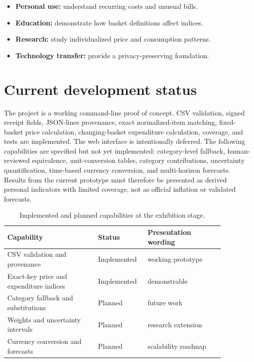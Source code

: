 \documentclass[10pt,a4paper]{article}
\newcommand{\chapter}[1]{
  \section{#1}
}
\begin{document}
\begin{itemize}
  \item \textbf{Personal use:} understand recurring costs and unusual bills.
  \item \textbf{Education:} demonstrate how basket definitions affect indices.
  \item \textbf{Research:} study individualized price and consumption patterns.
  \item \textbf{Technology transfer:} provide a privacy-preserving foundation.
\end{itemize}

\chapter{Current development status}
The project is a working command-line proof of concept. CSV validation,
signed receipt fields, JSON-lines provenance, exact normalized-item matching,
fixed-basket price calculation, changing-basket expenditure calculation,
coverage, and tests are implemented. The web interface is intentionally
deferred. The following capabilities are specified but not yet implemented:
category-level fallback, human-reviewed equivalence, unit-conversion tables,
category contributions, uncertainty quantification, time-based currency
conversion, and multi-horizon forecasts. Results from the current prototype
must therefore be presented as derived personal indicators with limited
coverage, not as official inflation or validated forecasts.

\begin{table}[ht]
  \centering
  \caption{Implemented and planned capabilities at the exhibition stage.}
  \small
  \begin{tabular}{p{0.38\linewidth}p{0.18\linewidth}p{0.32\linewidth}}
    \toprule
    Capability & Status & Presentation wording\\
    \midrule
    CSV validation and provenance & Implemented & working prototype\\
    Exact-key price and expenditure indices & Implemented & demonstrable\\
    Category fallback and substitutions & Planned & future work\\
    Weights and uncertainty intervals & Planned & research extension\\
    Currency conversion and forecasts & Planned & scalability roadmap\\
    \bottomrule
  \end{tabular}
\end{table}
\end{document}
